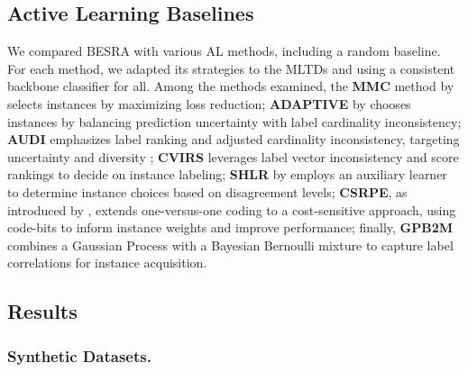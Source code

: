 \documentclass[letterpaper]{article} %
\begin{document}
\subsection{Active Learning Baselines}






We compared BESRA with various AL methods, including a random baseline.
For each method, we adapted its strategies to the MLTDs and using a consistent backbone classifier for all.
Among the methods examined, the \textbf{MMC} method by \citet{mmc2009} selects instances by maximizing loss reduction; \textbf{ADAPTIVE} by \citet{adaptive2013} chooses instances by balancing prediction uncertainty with label cardinality inconsistency; \textbf{AUDI} emphasizes label ranking and adjusted cardinality inconsistency, targeting uncertainty and diversity \cite{6729601}; \textbf{CVIRS} \cite{REYES2018494} leverages label vector inconsistency and score rankings to decide on instance labeling; \textbf{SHLR} by \citet{pmlr-v20-hung11} employs an auxiliary learner to determine instance choices based on disagreement levels; \textbf{CSRPE}, as introduced by \citet{10.1007/978-3-319-93034-3_12}, extends one-versus-one coding to a cost-sensitive approach, using code-bits to inform instance weights and improve performance; finally, \textbf{GPB2M} \cite{gaupb2_2021} combines a Gaussian Process with a Bayesian Bernoulli mixture to capture label correlations for instance acquisition.







\subsection{Results}

\subsubsection{Synthetic Datasets.}
\end{document}
